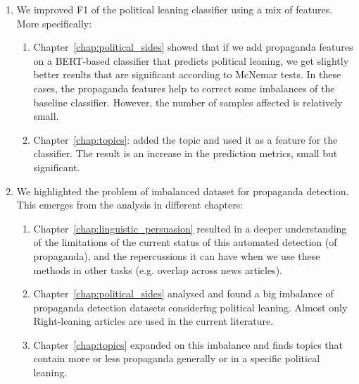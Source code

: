 \begin{enumerate}
\begin{enumerate}
    \end{enumerate}
    \item We improved F1 of the political leaning classifier using a mix of features.
    More specifically:
    \begin{enumerate}
        \item Chapter~\ref{chap:political_sides} showed that if we add propaganda features on a BERT-based classifier that predicts political leaning, we get slightly better results that are significant according to McNemar tests. In these cases, the propaganda features help to correct some imbalances of the baseline classifier. However, the number of samples affected is relatively small.
        \item Chapter~\ref{chap:topics}: added the topic and used it as a feature for the classifier. The result is an increase in the prediction metrics, small but significant.
    \end{enumerate}
    \item We highlighted the problem of imbalanced dataset for propaganda detection. This emerges from the analysis in different chapters:
    \begin{enumerate}
        \item Chapter~\ref{chap:linguistic_persuasion} resulted in a deeper understanding of the limitations of the current status of this automated detection (of propaganda), and the repercussions it can have when we use these methods in other tasks (e.g. overlap across news articles).
        \item Chapter~\ref{chap:political_sides} analysed and found a big imbalance of propaganda detection datasets considering political leaning. Almost only Right-leaning articles are used in the current literature.
        \item Chapter~\ref{chap:topics} expanded on this imbalance and finds topics that contain more or less propaganda generally or in a specific political leaning.
    \end{enumerate}


\end{enumerate}
